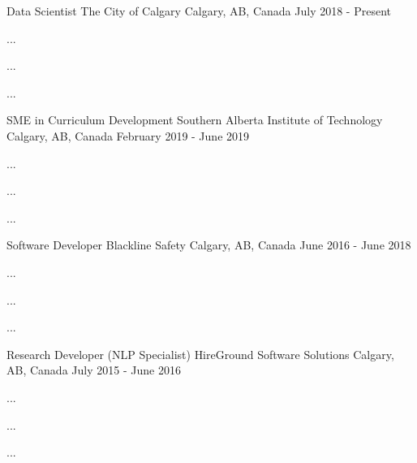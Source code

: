 

\begin{cventries}

  \cventry
    {Data Scientist} %
    {The City of Calgary} %
    {Calgary, AB, Canada} %
    {July 2018 - Present} %
    {
      \begin{cvitems} %
        \item {...}
        \item {...}
        \item {...}
      \end{cvitems}
    }

  \cventry
    {SME in Curriculum Development} %
    {Southern Alberta Institute of Technology} %
    {Calgary, AB, Canada} %
    {February 2019 - June 2019} %
    {
      \begin{cvitems} %
        \item {...}
        \item {...}
        \item {...}
      \end{cvitems}
    }

  \cventry
    {Software Developer} %
    {Blackline Safety} %
    {Calgary, AB, Canada} %
    {June 2016 - June 2018} %
    {
      \begin{cvitems} %
        \item {...}
        \item {...}
        \item {...}
      \end{cvitems}
    }

  \cventry
    {Research Developer (NLP Specialist)} %
    {HireGround Software Solutions} %
    {Calgary, AB, Canada} %
    {July 2015 - June 2016} %
    {
      \begin{cvitems} %
        \item {...}
        \item {...}
        \item {...}
      \end{cvitems}
    }

\end{cventries}
